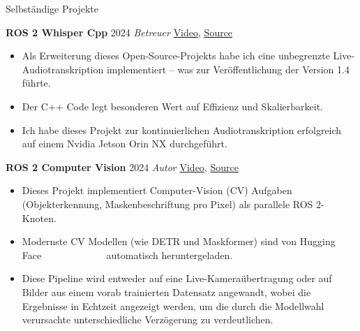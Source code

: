 \begin{rubric}{Selbständige Projekte}

\entry*[] \textbf{ROS 2 Whisper Cpp} \hfill 2024 \newline 
\emph{Betreuer} \hfill \href{https://github.com/ros-ai/ros2_whisper/blob/main/doc/harry_potter_sample.gif}{Video}, \href{https://github.com/ros-ai/ros2_whisper}{\faGithub Source} \newline  
\vspace{\CVItemizeHeaderSpacing} \begin{itemize}[leftmargin=*, rightmargin=1cm]
	\setlength{\itemsep}{\CVItemizeSpacing}
	\item Als Erweiterung dieses Open-Source-Projekts habe ich eine unbegrenzte Live-Audiotranskription implementiert -- was zur Veröffentlichung der Version 1.4 führte. 
	\item Der C++ Code legt besonderen Wert auf Effizienz und Skalierbarkeit.
	\item Ich habe dieses Projekt zur kontinuierlichen Audiotranskription erfolgreich auf einem Nvidia Jetson Orin NX durchgeführt.
\end{itemize}  

\entry*[] \textbf{ROS 2 Computer Vision} \hfill 2024 \newline \emph{Autor} \hfill \href{https://github.com/NathanCorral/ROS-HF-Vision/blob/main/doc/gifs/ex_german_roads.gif}{Video}, \href{https://github.com/NathanCorral/ROS-HF-Vision/tree/main}{\faGithub Source} \newline  
\vspace{\CVItemizeHeaderSpacing} \begin{itemize}[leftmargin=*, rightmargin=1cm] 
	\setlength{\itemsep}{\CVItemizeSpacing}  
	\item Dieses Projekt implementiert Computer-Vision (CV) Aufgaben (Objekterkennung, Maskenbeschriftung pro Pixel) als parallele ROS 2-Knoten.
	\item Modernste CV Modellen (wie DETR und Maskformer) sind von Hugging Face ~~~~~~~~~~~~ automatisch heruntergeladen.
	\item Diese Pipeline wird entweder auf eine Live-Kameraübertragung oder auf Bilder aus einem vorab trainierten Datensatz angewandt, wobei die Ergebnisse in Echtzeit angezeigt werden, um die durch die Modellwahl verursachte unterschiedliche Verzögerung zu verdeutlichen.
\end{itemize}  


\end{rubric}
